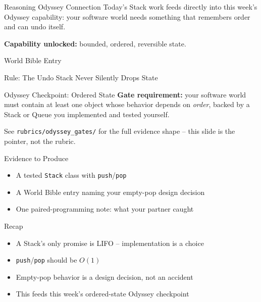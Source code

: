 \documentclass[aspectratio=169]{beamer}
\begin{document}
\begin{odysseyframe}{Reasoning Odyssey Connection}
  Today's Stack work feeds directly into this week's Odyssey capability:
  your software world needs something that remembers order and can undo
  itself.

  \vspace{2mm}
  \textbf{Capability unlocked:} bounded, ordered, reversible state.
\end{odysseyframe}

\begin{worldbibleframe}{World Bible Entry}
  \begin{worldbibleentry}{Rule: The Undo Stack Never Silently Drops State}
  \end{worldbibleentry}
\end{worldbibleframe}

\begin{odysseygateframe}{Odyssey Checkpoint: Ordered State}
  \textbf{Gate requirement:} your software world must contain at least
  one object whose behavior depends on \emph{order}, backed by a Stack
  or Queue you implemented and tested yourself.

  \vspace{2mm}
  \small See \texttt{rubrics/odyssey\_gates/} for the full evidence shape --
  this slide is the pointer, not the rubric.
\end{odysseygateframe}

\begin{evidenceframe}{Evidence to Produce}
  \begin{itemize}
    \item A tested \texttt{Stack} class with \texttt{push}/\texttt{pop}
    \item A World Bible entry naming your empty-pop design decision
    \item One paired-programming note: what your partner caught
  \end{itemize}
\end{evidenceframe}

\begin{recapframe}{Recap}
  \begin{itemize}
    \item A Stack's only promise is LIFO -- implementation is a choice
    \item \texttt{push}/\texttt{pop} should be $O(1)$
    \item Empty-pop behavior is a design decision, not an accident
    \item This feeds this week's ordered-state Odyssey checkpoint
  \end{itemize}
\end{recapframe}
\end{document}

